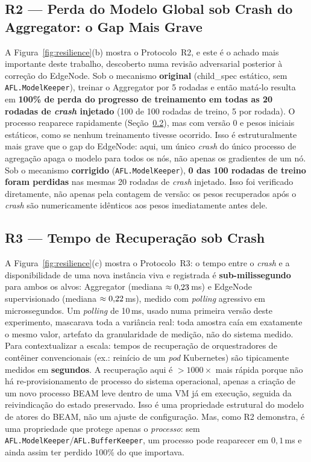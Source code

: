 \documentclass[conference,a4paper]{IEEEtran}
\begin{document}
\subsection{R2 --- Perda do Modelo Global sob Crash do Aggregator: o Gap Mais Grave}
\label{sec:r2}

A Figura~\ref{fig:resilience}(b) mostra o Protocolo~R2, e este é o
achado mais importante deste trabalho, descoberto numa revisão adversarial
posterior à correção do EdgeNode. Sob o mecanismo \textbf{original}
(child\_spec estático, sem \texttt{AFL.ModelKeeper}), treinar o Aggregator
por 5 rodadas e então matá-lo resulta em \textbf{100\% de perda do
progresso de treinamento em todas as 20 rodadas de \textit{crash}
injetado} (100 de 100 rodadas de treino, 5 por rodada). O processo
reaparece rapidamente (Seção~\ref{sec:r3}), mas com versão 0 e pesos
iniciais estáticos, como se nenhum treinamento tivesse ocorrido. Isso é
estruturalmente mais grave que o gap do EdgeNode: aqui, um único
\textit{crash} do único processo de agregação apaga o modelo para todos
os nós, não apenas os gradientes de um nó. Sob o mecanismo
\textbf{corrigido} (\texttt{AFL.ModelKeeper}), \textbf{0 das 100 rodadas
de treino foram perdidas} nas mesmas 20 rodadas de \textit{crash}
injetado. Isso foi verificado diretamente, não apenas pela contagem de versão:
os pesos recuperados após o \textit{crash} são numericamente idênticos
aos pesos imediatamente antes dele.

\subsection{R3 --- Tempo de Recuperação sob Crash}
\label{sec:r3}

A Figura~\ref{fig:resilience}(c) mostra o Protocolo~R3: o tempo entre o
\textit{crash} e a disponibilidade de uma nova instância viva e registrada
é \textbf{sub-milissegundo} para ambos os alvos: Aggregator (mediana
$\approx0{,}23$\,ms) e EdgeNode supervisionado (mediana
$\approx0{,}22$\,ms), medido com \textit{polling} agressivo em
microssegundos. Um \textit{polling} de 10\,ms, usado numa primeira versão
deste experimento, mascarava toda a variância real: toda amostra caía em
exatamente o mesmo valor, artefato da granularidade de medição, não do
sistema medido. Para contextualizar a escala: tempos de recuperação de
orquestradores de contêiner convencionais (ex.: reinício de um
\textit{pod} Kubernetes) são tipicamente medidos em \textbf{segundos}. A
recuperação aqui é $>1000\times$ mais rápida porque não há
re-provisionamento de processo do sistema operacional, apenas a criação
de um novo processo BEAM leve dentro de uma VM já em execução, seguida da
reivindicação do estado preservado. Isso é uma propriedade estrutural do
modelo de atores do BEAM, não um ajuste de configuração. Mas, como R2
demonstra, é uma propriedade que protege apenas o \emph{processo}: sem
\texttt{AFL.ModelKeeper}/\texttt{AFL.BufferKeeper}, um processo pode
reaparecer em $0{,}1$\,ms e ainda assim ter perdido 100\% do que importava.
\end{document}
